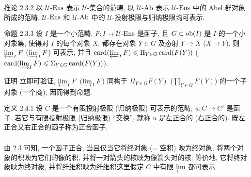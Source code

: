 \begin{enonce*}{推论 2.3.2}
以 $𝒰$-$\operatorname{Ens}$ 表示 $𝒰$-集合的范畴,
以 $𝒰$-$\operatorname{Ab}$ 表示 $𝒰$-$\operatorname{Ens}$ 中的 Abel 群对象所成的范畴.
$𝒰$-$\operatorname{Ens}$ 和 $𝒰$-$\operatorname{Ab}$ 中的 $𝒰$-投射极限与归纳极限均可表示.
\end{enonce*}

\begin{enonce*}{命题 2.3.3}
设 $I$ 是一个小范畴, $F:I\rightarrow 𝒰$-$\operatorname{Ens}$
是函子, 且 \linebreak %
$G\subset\operatorname{ob}(I)$ 是 $I$ 的一个小对象集,
使得对 $I$ 的每个对象 $X$, 都存在对象 $Y\in G$ 及态射
$Y\rightarrow X$ (\resp $X\rightarrow Y$).
则 $\varprojlim_I F$
(\resp $\varinjlim_I F$) 可表示, 并且
$\operatorname{card}(\varprojlim_I F)\leqslant \Pi_{Y\in G}\operatorname{card}(F(Y))$ (\resp
$\operatorname{card}(\varinjlim_I F)\leqslant \Sigma_{Y\in G}\operatorname{card}(F(Y))$).
\end{enonce*}

\begin{enonce*}[remark]{证明}
立即可验证, $\varprojlim_I F$ (\resp $\varinjlim_I
F$) 同构于 $\Pi_{Y\in
G}F(Y)$ (\resp $\amalg_{Y\in G}F(Y)$) 的一个子对象
(\resp 一个商); 因而得到命题.
\end{enonce*}

\begin{enonce*}{定义 2.4.1}
设 $C$ 是一个有限投射极限 (\resp 归纳极限) 可表示的范畴,
$u:C\rightarrow C'$ 是函子.
若它与有限投射极限 (\resp 归纳极限) “交换”,
就称 $u$ 是左正合的 (\resp 右正合的).
既左正合又右正合的函子称为正合函子.
\end{enonce*}

\setcounter{subsection}{4} \setcounter{subsubsection}{1}
\subsubsection{}
由 \hyperref[I.prop2.3]{2.3} 可知, 一个函子正合, %
当且仅当它将终对象 (= 空积) 映为终对象,
将两个对象的积映为它们的像的积,
并将一对箭头的核映为像箭头对的核;
等价地, 它将终对象映为终对象, 并将纤维积映为纤维积这里假定 $C$ 中有限 $\varprojlim$ 都可表示

\setcounter{subsection}{5} \setcounter{subsubsection}{-1}
